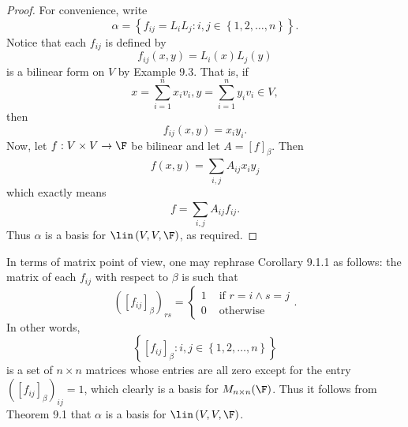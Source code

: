 \documentclass[linearalgebra]{subfiles}
\begin{document}
    \begin{proof}
        For convenience, write
        \begin{equation*}
            \alpha = \left\lbrace f_{ij}=L_iL_j: i,j\in \left\lbrace 1,2,\ldots,n \right\rbrace  \right\rbrace .
        \end{equation*}
        Notice that each $f_{ij}$ is defined by
        \begin{equation*}
            f_{ij}\left( x,y \right) = L_i(x)L_j(y)
        \end{equation*}
        is a bilinear form on $V$ by Example 9.3. That is, if
        \begin{equation*}
            x = \sum^{n}_{i=1} x_iv_i, y = \sum^{n}_{i=1} y_iv_i\in V,
        \end{equation*}
        then
        \begin{equation*}
            f_{ij} (x,y) = x_iy_i.
        \end{equation*}
        Now, let $f:V\times V\to\F$ be bilinear and let $A = \left[ f \right] _\beta$. Then
        \begin{equation*}
            f\left( x,y \right) = \sum^{}_{i,j} A_{ij}x_iy_j
        \end{equation*}
        which exactly means
        \begin{equation*}
            f = \sum^{}_{i,j} A_{ij}f_{ij}.
        \end{equation*}
        Thus $\alpha$ is a basis for $\lin\left( V,V,\F \right)$, as required.
    \end{proof}

    \begin{remark}
        In terms of matrix point of view, one may rephrase Corollary 9.1.1 as follows: the matrix of each $f_{ij}$ with respect to $\beta$ is such that
        \begin{equation*}
            \left( \left[ f_{ij} \right] _\beta \right) _{rs} =
            \begin{cases}
                1 & \text{ if } r = i \land s = j \\
                0 & \text{ otherwise} 
            \end{cases}.
        \end{equation*}
        In other words,
        \begin{equation*}
            \left\lbrace \left[ f_{ij} \right] _\beta : i,j\in \left\lbrace 1,2,\ldots,n \right\rbrace  \right\rbrace 
        \end{equation*}
        is a set of $n\times n$ matrices whose entries are all zero except for the entry $\left( \left[ f_{ij} \right] _\beta \right) _{ij} = 1$, which clearly is a basis for $M_{n\times n}(\F)$. Thus it follows from Theorem 9.1 that $\alpha$ is a basis for $\lin\left( V,V,\F \right)$.
    \end{remark}
\end{document}
